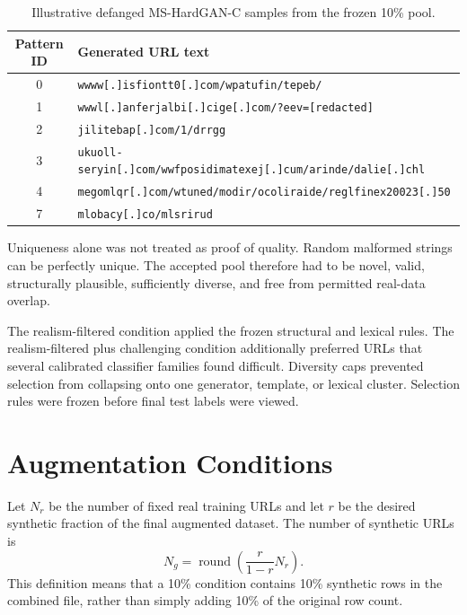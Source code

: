 \begin{table}[htbp]
\centering
\caption{Illustrative defanged MS-HardGAN-C samples from the frozen 10\% pool.}
\label{tab:method-gan-url-examples}
\small
\begin{tabular}{@{}cp{}@{}}
\toprule
Pattern ID & Generated URL text \\
\midrule
0 & \nolinkurl{wwww[.]isfiontt0[.]com/wpatufin/tepeb/} \\
1 & \nolinkurl{wwwl[.]anferjalbi[.]cige[.]com/?eev=[redacted]} \\
2 & \nolinkurl{jilitebap[.]com/1/drrgg} \\
3 & \nolinkurl{ukuoll-seryin[.]com/wwfposidimatexej[.]cum/arinde/dalie[.]chl} \\
4 & \nolinkurl{megomlqr[.]com/wtuned/modir/ocoliraide/reglfinex20023[.]50} \\
7 & \nolinkurl{mlobacy[.]co/mlsrirud} \\
\bottomrule
\end{tabular}
\end{table}

Uniqueness alone was not treated as proof of quality. Random malformed strings
can be perfectly unique. The accepted pool therefore had to be novel, valid,
structurally plausible, sufficiently diverse, and free from permitted real-data
overlap.

The realism-filtered condition applied the frozen structural and lexical rules.
The realism-filtered plus challenging condition additionally preferred URLs
that several calibrated classifier families found difficult. Diversity caps
prevented selection from collapsing onto one generator, template, or lexical
cluster. Selection rules were frozen before final test labels were viewed.

\section{Augmentation Conditions}

Let $N_r$ be the number of fixed real training URLs and let $r$ be the desired
synthetic fraction of the final augmented dataset. The number of synthetic URLs
is
\begin{equation}
    N_g=\operatorname{round}\!\left(\frac{r}{1-r}N_r\right).
    \label{eq:method-augmentation-count}
\end{equation}
This definition means that a 10\% condition contains 10\% synthetic rows in the
combined file, rather than simply adding 10\% of the original row count.

